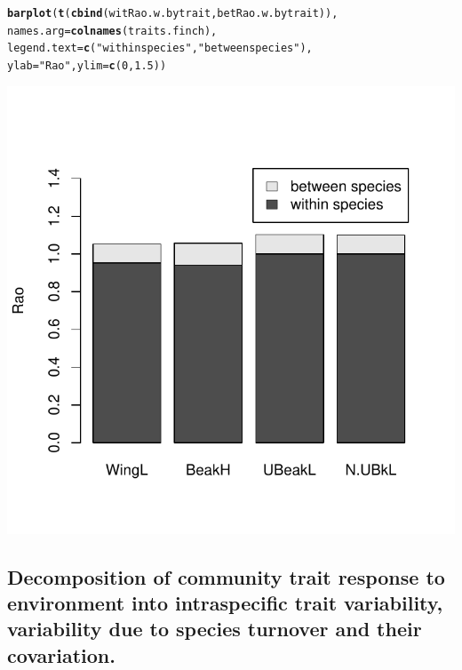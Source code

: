 \documentclass[12pt]{article}\usepackage[]{graphicx}\usepackage[]{color}
\makeatletter
\def\maxwidth{ %
  \ifdim\Gin@nat@width>\linewidth
    \linewidth
  \else
    \Gin@nat@width
  \fi
}
\newcommand{\hlnum}[1]{\textcolor[rgb]{0.686,0.059,0.569}{#1}}%
\newcommand{\hlstr}[1]{\textcolor[rgb]{0.192,0.494,0.8}{#1}}%
\newcommand{\hlstd}[1]{\textcolor[rgb]{0.345,0.345,0.345}{#1}}%
\newcommand{\hlkwc}[1]{\textcolor[rgb]{0.333,0.667,0.333}{#1}}%
\newcommand{\hlkwd}[1]{\textcolor[rgb]{0.737,0.353,0.396}{\textbf{#1}}}%
\newenvironment{kframe}{%
 \def\at@end@of@kframe{}%
 \ifinner\ifhmode%
  \def\at@end@of@kframe{\end{minipage}}%
  \begin{minipage}{\columnwidth}%
 \fi\fi%
 \def\FrameCommand##1{\hskip\@totalleftmargin \hskip-\fboxsep
 \colorbox{shadecolor}{##1}\hskip-\fboxsep
     \hskip-\linewidth \hskip-\@totalleftmargin \hskip\columnwidth}%
 \MakeFramed {\advance\hsize-\width
   \@totalleftmargin\z@ \linewidth\hsize
   \@setminipage}}%
 {\par\unskip\endMakeFramed%
 \at@end@of@kframe}
\newenvironment{knitrout}{}{} %
\makeatother
\begin{document}
\begin{knitrout}
\color{fgcolor}\begin{kframe}
\begin{alltt}
\hlkwd{barplot}\hlstd{(}\hlkwd{t}\hlstd{(}\hlkwd{cbind}\hlstd{( witRao.w.bytrait, betRao.w.bytrait)),}
    \hlkwc{names.arg} \hlstd{=} \hlkwd{colnames}\hlstd{(traits.finch),}
    \hlkwc{legend.text} \hlstd{=} \hlkwd{c}\hlstd{(}\hlstr{"within species"}\hlstd{,} \hlstr{"between species"}\hlstd{),}
    \hlkwc{ylab} \hlstd{=} \hlstr{"Rao"}\hlstd{,} \hlkwc{ylim} \hlstd{=} \hlkwd{c}\hlstd{(}\hlnum{0}\hlstd{,}\hlnum{1.5}\hlstd{))}
\end{alltt}
\end{kframe}

{\centering \includegraphics[width=\maxwidth]{figure/unnamed-chunk-21} 

}



\end{knitrout}


\subsection{Decomposition of community trait response to environment into intraspecific trait variability, variability due to species turnover and their covariation.}
\end{document}
